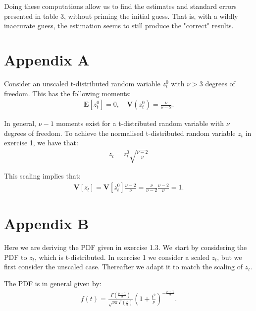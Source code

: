 \documentclass[11pt,a4paper,oneside]{article}
\newcommand{\lp}{\left(}
\newcommand{\rp}{\right)}
\newcommand{\rb}{\right]}
\newcommand{\lb}{\left[}
\newcommand{\ee}{\mathbf{E}}
\newcommand{\vv}{\mathbf{V}}
\begin{document}
Doing these computations allow us to find the estimates and standard errors presented in table 3, without priming the initial guess. That is, with a wildly inaccurate guess, the estimation seems to still produce the "correct" results.









\clearpage


\section{Appendix A}
\renewcommand{\theequation}{A.\arabic{equation}}
\setcounter{equation}{0}

Consider an unscaled t-distributed random variable $z_t^0$ with $\nu > 3$ degrees of freedom. This has the following moments:
\begin{align}
    \ee\lb z_t^0\rb = 0, \quad \vv\lp z_t^0\rp = \frac{\nu}{\nu - 2}.
\end{align}

In general, $\nu - 1$ moments exist for a t-distributed random variable with $\nu$ degrees of freedom. To achieve the normalised t-distributed random variable $z_t$ in exercise 1, we have that:
\begin{align}
    z_t = z_t^0 \sqrt{\frac{\nu - 2}{\nu}}
\end{align}

This scaling implies that:
\begin{gather}
    \vv\lb z_t\rb
        = \vv\lb z_t^0\rb \frac{\nu - 2}{\nu}
        = \frac{\nu}{\nu - 2}\frac{\nu - 2}{\nu}
        = 1.
\end{gather}


\clearpage

\section{Appendix B}
\renewcommand{\theequation}{B.\arabic{equation}}
\setcounter{equation}{0}
Here we are deriving the PDF given in exercise 1.3.  We start by considering the PDF to $z_t$, which is t-distributed. In exercise 1 we consider a scaled $z_t$, but we first consider the unscaled case. Thereafter we adapt it to match the scaling of $z_t$.

The PDF is in general given by:
\begin{align}
    f\lp t\rp = \frac{\Gamma\lp \frac{\nu + 1}{2}\rp}{\sqrt{\nu \pi}\Gamma\lp \frac{\nu}{2}\rp}\lp 1 + \frac{t^2}{\nu}\rp^{-\frac{\nu + 1}{2}}.
\end{align}
\end{document}
